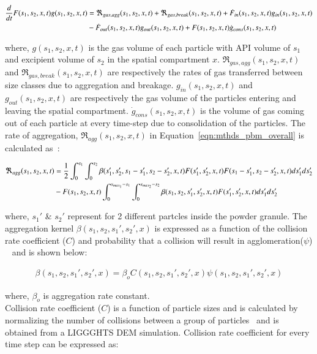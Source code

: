 \documentclass[preprint,11pt,authoryear]{elsarticle}
\begin{document}
\begin{align}
\frac{d}{dt}F(s_1,s_2,x,t)g(s_1,s_2,x,t)&= 
\Re_{gas,agg}(s_1,s_2,x,t)+\Re_{gas,break}(s_1,s_2,x,t)+\dot{F}_{in}(s_1,s_2,x,t)g_{in}(s_1,s_2,x,t)\notag\\
&-\dot{F}_{out}(s_1,s_2,x,t)g_{out}(s_1,s_2,x,t)+F(s_1,s_2,x,t)\dot{g}_{cons}(s_1,s_2,x,t)
\label{eqn:mthds_pbm_gas_agg} 
\end{align}

where, $g(s_1,s_2,x,t)$ is the gas volume of each particle with API volume of $s_1$ and excipient 
volume of $s_2$ in the spatial compartment $x$. $\Re_{gas,agg}(s_1,s_2,x,t)$ and 
$\Re_{gas,break}(s_1,s_2,x,t)$ are respectively the rates of gas transferred between size classes due to 
aggregation and breakage. $g_{in}(s_1,s_2,x,t)$ and $g_{out}(s_1,s_2,x,t)$ are respectively the gas 
volume of the particles entering and leaving the spatial compartment. $\dot{g}_{cons}(s_1,s_2,x,t)$ is the 
volume of gas coming out of each particle at every time-step due to consolidation of the particles. 
The rate of aggregation, $\Re_{agg}(s_1,s_2,x,t)$ in Equation~\ref{eqn:mthds_pbm_overall} is 
calculated as~\citep{Chaturbedi2017}:

\begin{align}
\Re_{agg}(s_1,s_2,x,t)&= \frac{1}{2}\int _0^{s_1} \int_0^{s_2} 
\beta(s_1',s_2',s_1-s_1',s_2-s_2',x,t)F(s_1',s_2',x,t)F(s_1-s_1',s_2-s_2',x,t)ds_1'ds_2'\notag\\ 
&- F(s_1,s_2,x,t)\int _0^{s_{max_1}-s_1} \int_0^{s_{max_2}-s_2} 
\beta(s_1,s_2,s_1',s_2',x,t)F(s_1',s_2',x,t)ds_1'ds_2'
\end{align}


where, $s_1'$ \& $s_2'$ represent for 2 different partcles inside the powder granule. 
The aggregation kernel $\beta(s_1,s_2, s_1',s_2',x)$ is expressed as a function of the collision 
rate coefficient ($C$) and probability that a collision will result in agglomeration($\psi$)
~\citep{ingram2004} and is shown below: 

\begin{align}
\beta(s_1,s_2,s_1',s_2',x) = \beta_oC(s_1,s_2,s_1',s_2',x)\psi(s_1,s_2,s_1',s_2',x)
\label{eqn:mthds_pbm_beta_kernal}
\end{align}

where, $\beta_o$ is aggregation rate constant.\\
Collision rate coefficient ($C$) is a function of particle sizes and is calculated by normalizing the 
number of collisions between a group of particles~\citep{gantt2006} and is obtained from a LIGGGHTS 
DEM simulation. Collision rate coefficient for every time step can be expressed as:
\end{document}
